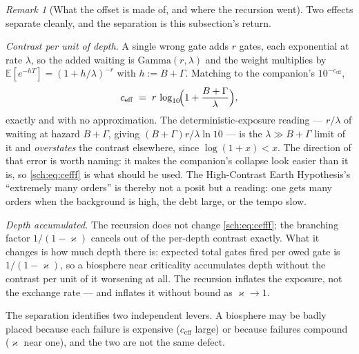 \documentclass[11pt]{article}
\numberwithin{equation}{section}
\theoremstyle{plain}
\theoremstyle{definition}
\theoremstyle{remark}
\newtheorem{remark}[theorem]{Remark}
\newcommand{\E}{\mathbb{E}}
\begin{document}
\begin{remark}[What the offset is made of, and where the recursion
went]\label{sch:rem:cefff}
Two effects separate cleanly, and the separation is this subsection's
return.

\emph{Contrast per unit of depth.} A single wrong gate adds $r$ gates,
each exponential at rate $\lambda$, so the added waiting is
$\mathrm{Gamma}(r,\lambda)$ and the weight multiplies by
$\E[e^{-hT}]=(1+h/\lambda)^{-r}$ with $h:=B+\Gamma$. Matching to the
companion's $10^{-c_{\mathrm{eff}}}$,
\begin{equation}\label{sch:eq:cefff}
c_{\mathrm{eff}}\;=\;r\,\log_{10}\!\Bigl(1+\frac{B+\Gamma}{\lambda}\Bigr),
\end{equation}
exactly and with no approximation. The deterministic-exposure reading
--- $r/\lambda$ of waiting at hazard $B+\Gamma$, giving
$(B+\Gamma)r/\lambda\ln10$ --- is the $\lambda\gg B+\Gamma$ limit of it
and \emph{overstates} the contrast elsewhere, since $\log(1+x)<x$. The
direction of that error is worth naming: it makes the companion's
collapse look easier than it is, so \eqref{sch:eq:cefff} is what should
be used. The High-Contrast Earth
Hypothesis's ``extremely many orders'' is thereby not a posit but a
reading: one gets many orders when the background is high, the debt
large, or the tempo slow.

\emph{Depth accumulated.} The recursion does not change
\eqref{sch:eq:cefff}; the branching factor $1/(1-\varkappa)$ cancels out of the
per-depth contrast exactly. What it changes is how much depth there is:
expected total gates fired per owed gate is $1/(1-\varkappa)$, so a biosphere
near criticality accumulates depth without the contrast per unit of it
worsening at all. The recursion inflates the exposure, not the exchange
rate --- and inflates it without bound as $\varkappa\to1$.

The separation identifies two independent levers. A biosphere may be
badly placed because each failure is expensive ($c_{\mathrm{eff}}$
large) or because failures compound ($\varkappa$ near one), and the two are not
the same defect.
\end{remark}
\end{document}
